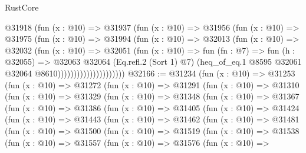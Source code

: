 \begin{lexlean}{RustCore}
\begin{coremodule}
                          @31918
                            (fun (x : @10) =>
                            @31937
                              (fun (x : @10) =>
                              @31956
                                (fun (x : @10) =>
                                @31975
                                  (fun (x : @10) =>
                                  @31994
                                    (fun (x : @10) =>
                                    @32013
                                      (fun (x : @10) =>
                                      @32032
                                        (fun (x : @10) =>
                                        @32051
                                          (fun (x : @10) =>
                                          fun (fn : @7) =>
                                          fun (h : @32055) =>
                                          @32063
                                            @32064
                                            (Eq.refl.{2} (Sort 1) @7)
                                            (heq_of_eq.{1}
                                              @8595
                                              @32061
                                              @32064
                                              @8610)))))))))))))))))))))
@32166 := @31234
    (fun (x : @10) =>
    @31253
      (fun (x : @10) =>
      @31272
        (fun (x : @10) =>
        @31291
          (fun (x : @10) =>
          @31310
            (fun (x : @10) =>
            @31329
              (fun (x : @10) =>
              @31348
                (fun (x : @10) =>
                @31367
                  (fun (x : @10) =>
                  @31386
                    (fun (x : @10) =>
                    @31405
                      (fun (x : @10) =>
                      @31424
                        (fun (x : @10) =>
                        @31443
                          (fun (x : @10) =>
                          @31462
                            (fun (x : @10) =>
                            @31481
                              (fun (x : @10) =>
                              @31500
                                (fun (x : @10) =>
                                @31519
                                  (fun (x : @10) =>
                                  @31538
                                    (fun (x : @10) =>
                                    @31557
                                      (fun (x : @10) =>
                                      @31576
                                        (fun (x : @10) =>

\end{coremodule}
\end{lexlean}
